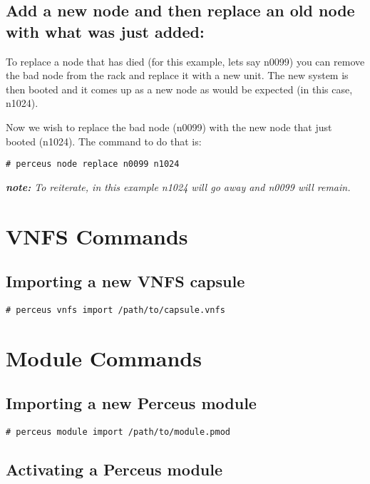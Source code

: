\documentclass[10pt,letterpaper]{report}
\begin{document}
\subsection{Add a new node and then replace an old node with what was just added:}

To replace a node that has died (for this example, lets say n0099) you
can remove the bad node from the rack and replace it with a new unit. The
new system is then booted and it comes up as a new node as would be
expected (in this case, n1024).

Now we wish to replace the bad node (n0099) with the new node that just
booted (n1024). The command to do that is:

\begin{verbatim}
# perceus node replace n0099 n1024
\end{verbatim}

{\it {\bf note:} To reiterate, in this example n1024 will go away and n0099
will remain.}

\section{VNFS Commands}

\subsection{Importing a new VNFS capsule}

\begin{verbatim}
# perceus vnfs import /path/to/capsule.vnfs
\end{verbatim}

\section{Module Commands}

\subsection{Importing a new Perceus module}

\begin{verbatim}
# perceus module import /path/to/module.pmod
\end{verbatim}

\subsection{Activating a Perceus module}
\end{document}
